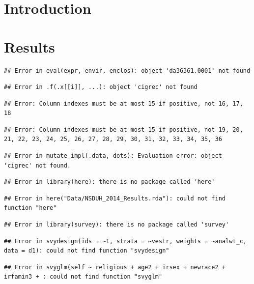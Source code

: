 \documentclass[]{DissertateUSU}
\begin{document}
\section{Introduction}\label{introduction-1}

\section{Results}\label{results-2}

\begin{verbatim}
## Error in eval(expr, envir, enclos): object 'da36361.0001' not found
\end{verbatim}

\begin{verbatim}
## Error in .f(.x[[i]], ...): object 'cigrec' not found
\end{verbatim}

\begin{verbatim}
## Error: Column indexes must be at most 15 if positive, not 16, 17, 18
\end{verbatim}

\begin{verbatim}
## Error: Column indexes must be at most 15 if positive, not 19, 20, 21, 22, 23, 24, 25, 26, 27, 28, 29, 30, 31, 32, 33, 34, 35, 36
\end{verbatim}

\begin{verbatim}
## Error in mutate_impl(.data, dots): Evaluation error: object 'cigrec' not found.
\end{verbatim}

\begin{verbatim}
## Error in library(here): there is no package called 'here'
\end{verbatim}

\begin{verbatim}
## Error in here("Data/NSDUH_2014_Results.rda"): could not find function "here"
\end{verbatim}

\begin{verbatim}
## Error in library(survey): there is no package called 'survey'
\end{verbatim}

\begin{verbatim}
## Error in svydesign(ids = ~1, strata = ~vestr, weights = ~analwt_c, data = d1): could not find function "svydesign"
\end{verbatim}

\begin{verbatim}
## Error in svyglm(self ~ religious + age2 + irsex + newrace2 + irfamin3 + : could not find function "svyglm"
\end{verbatim}
\end{document}
